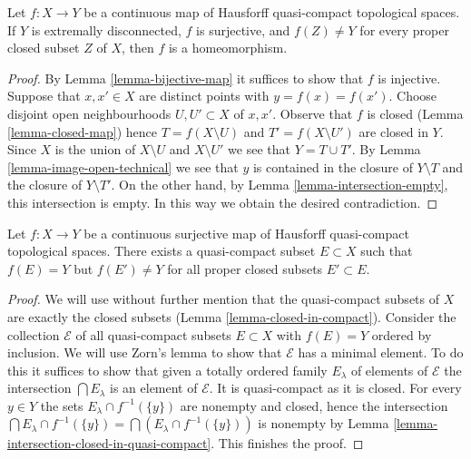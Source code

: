 \begin{lemma}
\label{lemma-isomorphism}
Let $f : X \to Y$ be a continuous map of Hausforff quasi-compact
topological spaces. If $Y$ is extremally disconnected, $f$ is surjective,
and $f(Z) \not = Y$ for every proper closed subset $Z$ of $X$, then
$f$ is a homeomorphism.
\end{lemma}

\begin{proof}
By Lemma \ref{lemma-bijective-map} it suffices to show that $f$ is injective.
Suppose that $x, x' \in X$ are distinct points with $y = f(x) = f(x')$.
Choose disjoint open neighbourhoods $U, U' \subset X$ of $x, x'$.
Observe that $f$ is closed (Lemma \ref{lemma-closed-map}) hence
$T = f(X \setminus U)$ and $T' = f(X \setminus U')$ are closed in $Y$.
Since $X$ is the union of $X \setminus U$ and $X \setminus U'$ we see that
$Y = T \cup T'$. By Lemma \ref{lemma-image-open-technical} we
see that $y$ is contained in the closure of $Y \setminus T$ and
the closure of $Y \setminus T'$. On the other hand, by
Lemma \ref{lemma-intersection-empty},
this intersection is empty. In this way we obtain the desired contradiction.
\end{proof}

\begin{lemma}
\label{lemma-find-compact-subset}
Let $f : X \to Y$ be a continuous surjective map of Hausforff quasi-compact
topological spaces. There exists a quasi-compact subset $E \subset X$
such that $f(E) = Y$ but $f(E') \not = Y$ for all proper closed subsets
$E' \subset E$.
\end{lemma}

\begin{proof}
We will use without further mention that the quasi-compact subsets
of $X$ are exactly the closed subsets
(Lemma \ref{lemma-closed-in-compact}).
Consider the collection $\mathcal{E}$ of all quasi-compact subsets
$E \subset X$ with $f(E) = Y$ ordered by inclusion. We will use
Zorn's lemma to show that
$\mathcal{E}$ has a minimal element. To do this it suffices to show
that given a totally ordered family $E_\lambda$ of elements of $\mathcal{E}$
the intersection $\bigcap E_\lambda$ is an element of $\mathcal{E}$.
It is quasi-compact as it is closed.
For every $y \in Y$ the sets $E_\lambda \cap f^{-1}(\{y\})$
are nonempty and closed, hence the intersection
$\bigcap E_\lambda \cap f^{-1}(\{y\}) = \bigcap (E_\lambda \cap f^{-1}(\{y\}))$
is nonempty by
Lemma \ref{lemma-intersection-closed-in-quasi-compact}.
This finishes the proof.
\end{proof}


